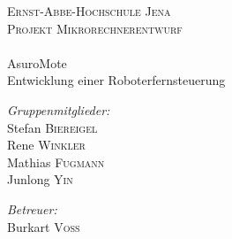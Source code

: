 \begin{titlepage}
\vspace*{\fill}
\begin{center}
	\textsc{\LARGE Ernst-Abbe-Hochschule Jena} \\ [1.5cm]

	\textsc{\Large Projekt Mikrorechnerentwurf} \\ [0.5cm]

	\HRule \\ [0.3cm]
	{\LARGE AsuroMote}\\	[0.3cm]
	{\Large Entwicklung einer Roboterfernsteuerung }
	\HRule \\ [1 cm]

	\begin{minipage}{0.4\textwidth}
		\begin{flushleft} \large
			\emph{Gruppenmitglieder:}\\
			Stefan \textsc{Biereigel}\\
			Rene \textsc{Winkler}\\
			Mathias \textsc{Fugmann}\\
			Junlong \textsc{Yin}\\
		\end{flushleft}
	\end{minipage}
	\begin{minipage}{0.4\textwidth}
		\begin{flushright} \large
			\emph{Betreuer:}\\
			Burkart \textsc{Voß}\\
		\end{flushright}
	\end{minipage}

\end{center}
\vspace*{\fill}
\end{titlepage}
